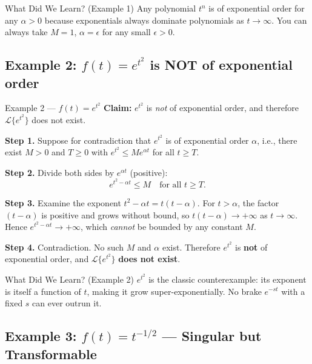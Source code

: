 \documentclass[12pt,a4paper]{article}
\begin{document}
\begin{learnbox}{What Did We Learn? (Example 1)}
Any polynomial $t^n$ is of exponential order for any $\alpha > 0$ because exponentials
always dominate polynomials as $t \to \infty$.
You can always take $M = 1$, $\alpha = \epsilon$ for any small $\epsilon > 0$.
\end{learnbox}

\subsection*{Example 2: $f(t) = e^{t^2}$ is NOT of exponential order}

\begin{infobox}{Example 2 --- $f(t) = e^{t^2}$}
\textbf{Claim:} $e^{t^2}$ is \emph{not} of exponential order, and therefore
$\mathcal{L}\{e^{t^2}\}$ does not exist.

\medskip
\textbf{Step 1.} Suppose for contradiction that $e^{t^2}$ is of exponential order $\alpha$, i.e.,
there exist $M > 0$ and $T \geq 0$ with $e^{t^2} \leq M e^{\alpha t}$ for all $t \geq T$.

\medskip
\textbf{Step 2.} Divide both sides by $e^{\alpha t}$ (positive):
\[
  e^{t^2 - \alpha t} \leq M \quad \text{for all } t \geq T.
\]

\medskip
\textbf{Step 3.} Examine the exponent $t^2 - \alpha t = t(t - \alpha)$.
For $t > \alpha$, the factor $(t - \alpha)$ is positive and grows without bound, so
$t(t - \alpha) \to +\infty$ as $t \to \infty$.
Hence $e^{t^2 - \alpha t} \to +\infty$, which \emph{cannot} be bounded by any constant $M$.

\medskip
\textbf{Step 4.} Contradiction. No such $M$ and $\alpha$ exist.
Therefore $e^{t^2}$ is \textbf{not} of exponential order, and
$\mathcal{L}\{e^{t^2}\}$ \textbf{does not exist}.
\end{infobox}

\begin{learnbox}{What Did We Learn? (Example 2)}
$e^{t^2}$ is the classic counterexample: its exponent is itself a function of $t$,
making it grow super-exponentially.
No brake $e^{-st}$ with a fixed $s$ can ever outrun it.
\end{learnbox}

\subsection*{Example 3: $f(t) = t^{-1/2}$ --- Singular but Transformable}
\end{document}
